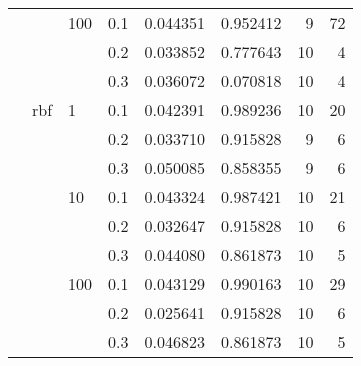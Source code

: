 \begin{table}[H]
\begin{tabular}{llllrrrr}
       &     & 100 & 0.1 &     0.044351 &  0.952412 &         9 &    72 \\
       &     &     & 0.2 &     0.033852 &  0.777643 &        10 &     4 \\
       &     &     & 0.3 &     0.036072 &  0.070818 &        10 &     4 \\
       & rbf & 1   & 0.1 &     0.042391 &  0.989236 &        10 &    20 \\
       &     &     & 0.2 &     0.033710 &  0.915828 &         9 &     6 \\
       &     &     & 0.3 &     0.050085 &  0.858355 &         9 &     6 \\
       &     & 10  & 0.1 &     0.043324 &  0.987421 &        10 &    21 \\
       &     &     & 0.2 &     0.032647 &  0.915828 &        10 &     6 \\
       &     &     & 0.3 &     0.044080 &  0.861873 &        10 &     5 \\
       &     & 100 & 0.1 &     0.043129 &  0.990163 &        10 &    29 \\
       &     &     & 0.2 &     0.025641 &  0.915828 &        10 &     6 \\
       &     &     & 0.3 &     0.046823 &  0.861873 &        10 &     5 \\
\bottomrule
\end{tabular}
\end{table}
